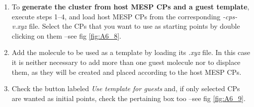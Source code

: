 \documentclass[10pt]{article}
\begin{document}
\begin{enumerate}
\item To {\bf generate the cluster from host MESP CPs and a guest template}, 
execute steps 1--4, and load host MESP CPs from the corresponding
{\it *-cps-v.xyz} file. Select the CPs that you want to use as starting points
by double clicking on them --see fig \ref{fig:A6_8}.

\item Add the molecule to be used as a template by loading its
{\it *.xyz} file. In this case it is neither necessary to add more than one
guest molecule nor to displace them,
as they will be created and placed according to the host MESP CPs.

\item Check the button labeled {\it Use template for guests} and, if
only selected CPs are wanted as initial points, check the pertaining box too
--see fig \ref{fig:A6_9}.


\end{enumerate}
\end{document}
